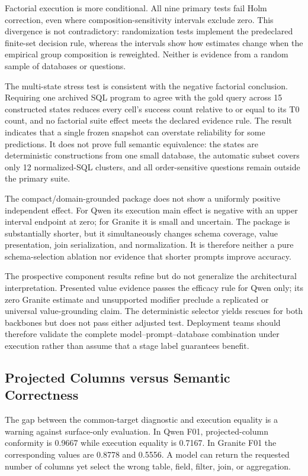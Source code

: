 \documentclass[applsci,article,submit,moreauthors]{Definitions/mdpi}
\begin{document}
Factorial execution is more conditional. All nine primary tests fail Holm correction, even where composition-sensitivity intervals exclude zero. This divergence is not contradictory: randomization tests implement the predeclared finite-set decision rule, whereas the intervals show how estimates change when the empirical group composition is reweighted. Neither is evidence from a random sample of databases or questions.

The multi-state stress test is consistent with the negative factorial conclusion. Requiring one archived SQL program to agree with the gold query across 15 constructed states reduces every cell's success count relative to or equal to its T0 count, and no factorial suite effect meets the declared evidence rule. The result indicates that a single frozen snapshot can overstate reliability for some predictions. It does not prove full semantic equivalence: the states are deterministic constructions from one small database, the automatic subset covers only 12 normalized-SQL clusters, and all order-sensitive questions remain outside the primary suite.

The compact/domain-grounded package does not show a uniformly positive independent effect. For Qwen its execution main effect is negative with an upper interval endpoint at zero; for Granite it is small and uncertain. The package is substantially shorter, but it simultaneously changes schema coverage, value presentation, join serialization, and normalization. It is therefore neither a pure schema-selection ablation nor evidence that shorter prompts improve accuracy.

The prospective component results refine but do not generalize the architectural interpretation. Presented value evidence passes the efficacy rule for Qwen only; its zero Granite estimate and unsupported modifier preclude a replicated or universal value-grounding claim. The deterministic selector yields rescues for both backbones but does not pass either adjusted test. Deployment teams should therefore validate the complete model--prompt--database combination under execution rather than assume that a stage label guarantees benefit.

\subsection{Projected Columns versus Semantic Correctness}
The gap between the common-target diagnostic and execution equality is a warning against surface-only evaluation. In Qwen F01, projected-column conformity is 0.9667 while execution equality is 0.7167. In Granite F01 the corresponding values are 0.8778 and 0.5556. A model can return the requested number of columns yet select the wrong table, field, filter, join, or aggregation.
\end{document}
